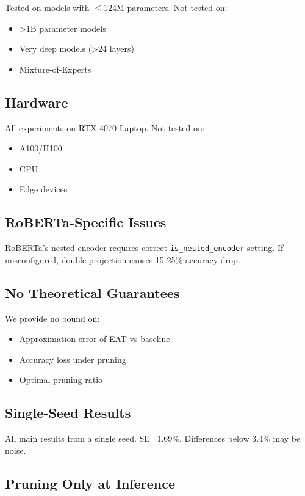 Tested on models with $\le$124M parameters. Not tested on:

\begin{itemize}
\item >1B parameter models
\item Very deep models (>24 layers)
\item Mixture-of-Experts

\end{itemize}
\subsection{Hardware}

All experiments on RTX 4070 Laptop. Not tested on:

\begin{itemize}
\item A100/H100
\item CPU
\item Edge devices

\end{itemize}
\subsection{RoBERTa-Specific Issues}

RoBERTa's nested encoder requires correct \texttt{is\_nested\_encoder} setting. If 
misconfigured, double projection causes 15-25\% accuracy drop.

\subsection{No Theoretical Guarantees}

We provide no bound on:

\begin{itemize}
\item Approximation error of EAT vs baseline
\item Accuracy loss under pruning
\item Optimal pruning ratio

\end{itemize}
\subsection{Single-Seed Results}

All main results from a single seed. SE ~1.69\%. Differences below 3.4\% 
may be noise.

\subsection{Pruning Only at Inference}

